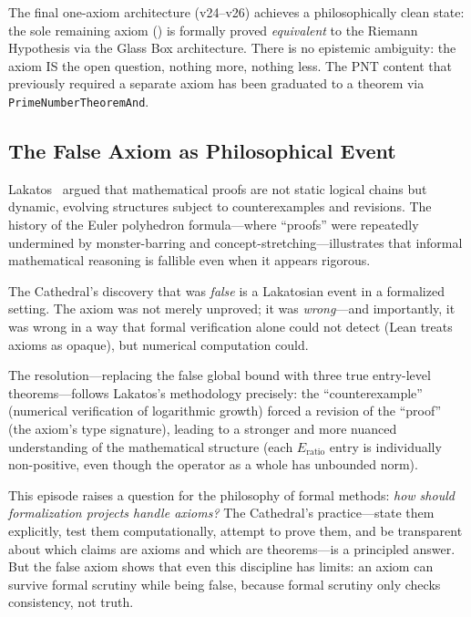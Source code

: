 The final one-axiom architecture (v24--v26) achieves a
philosophically clean state: the sole remaining axiom
() is formally proved
\emph{equivalent} to the Riemann Hypothesis via the Glass Box
architecture. There is no epistemic ambiguity: the axiom IS
the open question, nothing more, nothing less. The PNT content
that previously required a separate axiom has been graduated
to a theorem via \texttt{PrimeNumberTheoremAnd}.

\subsection{The False Axiom as Philosophical Event}

Lakatos~\cite{lakatos1976} argued that mathematical proofs are
not static logical chains but dynamic, evolving structures subject
to counterexamples and revisions. The history of the Euler
polyhedron formula---where ``proofs'' were repeatedly undermined
by monster-barring and concept-stretching---illustrates that
informal mathematical reasoning is fallible even when it appears
rigorous.

The Cathedral's discovery that 
was \emph{false} is a Lakatosian event in a formalized setting.
The axiom was not merely unproved; it was \emph{wrong}---and
importantly, it was wrong in a way that formal verification
alone could not detect (Lean treats axioms as opaque), but
numerical computation could.

The resolution---replacing the false global bound with three
true entry-level theorems---follows Lakatos's methodology
precisely: the ``counterexample'' (numerical verification of
logarithmic growth) forced a revision of the ``proof'' (the
axiom's type signature), leading to a stronger and more nuanced
understanding of the mathematical structure (each
$E_{\mathrm{ratio}}$ entry is individually non-positive, even
though the operator as a whole has unbounded norm).

This episode raises a question for the philosophy of formal
methods: \emph{how should formalization projects handle axioms?}
The Cathedral's practice---state them explicitly, test them
computationally, attempt to prove them, and be transparent about
which claims are axioms and which are theorems---is a principled
answer. But the false axiom shows that even this discipline has
limits: an axiom can survive formal scrutiny while being false,
because formal scrutiny only checks consistency, not truth.

